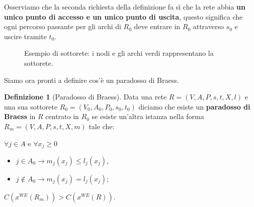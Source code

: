 \documentclass[a4paper]{article}
\theoremstyle{plain}
\theoremstyle{definition}
\newtheorem{mydef}[myteo]{Definizione}
\theoremstyle{remark}
\newcommand{\pa}[1]{\left(#1\right)}
\begin{document}
Osserviamo che la seconda richiesta della definizione fa sì che la
rete abbia \textbf{un unico punto di accesso e un unico punto di
  uscita}, questo significa che ogni percorso passante per gli archi
di $R_0$ deve entrare in $R_0$ attraverso $s_0$ e uscire tramite
$t_0$.

\begin{figure}[ht]
  \centering
  \caption{Esempio di sottorete: i nodi e gli archi verdi
    rappresentano la sottorete.}
  \label{fig:sottorete}
\end{figure}

Siamo ora pronti a definire cos'è un paradosso di Braess.
\begin{mydef}[Paradosso di Braess]
  Data una rete $R=(V,A,P,s,t,X,l)$ e una sua sottorete
  $R_0=(V_0,A_0,P_0,s_0,t_0)$ diciamo che esiste un
  \textbf{paradosso di Braess} in $R$ centrato in $R_0$ se esiste
  un'altra istanza nella forma $R_m=(V,A,P,s,t,X,m)$ tale che:
  \begin{enumerate}
    \begin{minipage}{1.0\linewidth}
    \item $\forall j\in A$ e $\forall x_j \ge0$
      \begin{itemize}
      \item $j \in A_0 \longrightarrow m_j(x_j) \le l_j(x_j)$,
      \item $j \not\in A_0\longrightarrow m_j(x_j) = l_j(x_j)$;
      \end{itemize}
    \end{minipage}
  \item $C\pa{x^{WE}\pa{R_m}} > C\pa{x^{WE}\pa{R}}$.
  \end{enumerate}
\end{mydef}
\end{document}
